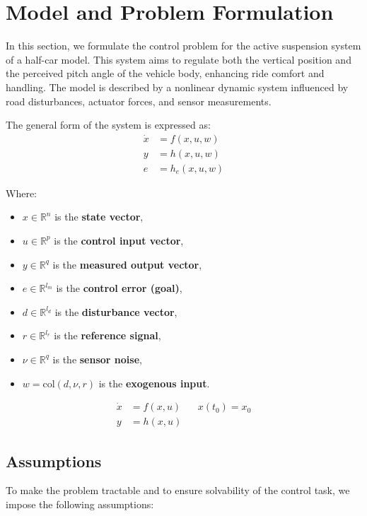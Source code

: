 \documentclass[]{report}
\begin{document}
\section{Model and Problem Formulation}
In this section, we formulate the control problem for the active suspension system of a half-car model. This system aims to regulate both the vertical position and the perceived pitch angle of the vehicle body, enhancing ride comfort and handling. The model is described by a nonlinear dynamic system influenced by road disturbances, actuator forces, and sensor measurements.

The general form of the system is expressed as:
\begin{align}
	\dot{x} &= f(x, u, w) \\
	y &= h(x, u, w) \\
	e &= h_e(x, u, w)
\end{align}

Where:
\begin{itemize}
	\item $x \in \mathbb{R}^n$ is the \textbf{state vector},
	\item $u \in \mathbb{R}^p$ is the \textbf{control input vector},
	\item $y \in \mathbb{R}^q$ is the \textbf{measured output vector},
	\item $e \in \mathbb{R}^{l_m}$ is the \textbf{control error (goal)},
	\item $d \in \mathbb{R}^{l_d}$ is the \textbf{disturbance vector},
	\item $r \in \mathbb{R}^{l_r}$ is the \textbf{reference signal},
	\item $\nu \in \mathbb{R}^q$ is the \textbf{sensor noise},
	\item $w = \text{col}(d, \nu, r)$ is the \textbf{exogenous input}.
\end{itemize}
\begin{equation}
	\label{eq:FormulaA}
	\begin{aligned}
		\dot{x} &= f(x,u) && x(t_0) = x_0
\\
y &= h(x,u)
\end{aligned}
\end{equation}
\subsection*{Assumptions}

To make the problem tractable and to ensure solvability of the control task, we impose the following assumptions:
\end{document}
